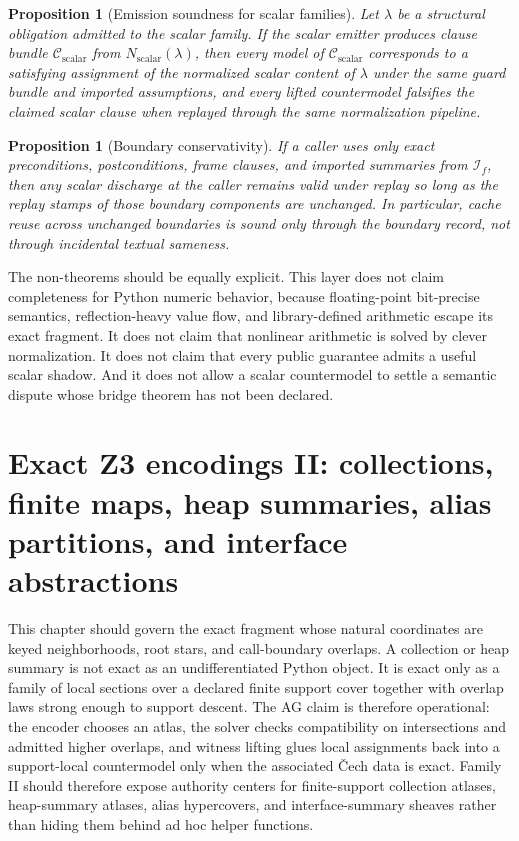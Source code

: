 \documentclass[11pt]{report}
\newtheorem{proposition}[definition]{Proposition}
\begin{document}
\begin{proposition}[Emission soundness for scalar families]
Let $\lambda$ be a structural obligation admitted to the scalar family. If the scalar emitter produces clause bundle $\mathcal{C}_{\mathrm{scalar}}$ from $N_{\mathrm{scalar}}(\lambda)$, then every model of $\mathcal{C}_{\mathrm{scalar}}$ corresponds to a satisfying assignment of the normalized scalar content of $\lambda$ under the same guard bundle and imported assumptions, and every lifted countermodel falsifies the claimed scalar clause when replayed through the same normalization pipeline.
\end{proposition}

\begin{proposition}[Boundary conservativity]
If a caller uses only exact preconditions, postconditions, frame clauses, and imported summaries from $\mathcal{I}_f$, then any scalar discharge at the caller remains valid under replay so long as the replay stamps of those boundary components are unchanged. In particular, cache reuse across unchanged boundaries is sound only through the boundary record, not through incidental textual sameness.
\end{proposition}

The non-theorems should be equally explicit. This layer does not claim completeness for Python numeric behavior, because floating-point bit-precise semantics, reflection-heavy value flow, and library-defined arithmetic escape its exact fragment. It does not claim that nonlinear arithmetic is solved by clever normalization. It does not claim that every public guarantee admits a useful scalar shadow. And it does not allow a scalar countermodel to settle a semantic dispute whose bridge theorem has not been declared.
\chapter{Exact Z3 encodings II: collections, finite maps, heap summaries, alias partitions, and interface abstractions}
This chapter should govern the exact fragment whose natural coordinates are keyed neighborhoods, root stars, and call-boundary overlaps. A collection or heap summary is not exact as an undifferentiated Python object. It is exact only as a family of local sections over a declared finite support cover together with overlap laws strong enough to support descent. The AG claim is therefore operational: the encoder chooses an atlas, the solver checks compatibility on intersections and admitted higher overlaps, and witness lifting glues local assignments back into a support-local countermodel only when the associated \v{C}ech data is exact. Family II should therefore expose authority centers for finite-support collection atlases, heap-summary atlases, alias hypercovers, and interface-summary sheaves rather than hiding them behind ad hoc helper functions.
\end{document}
